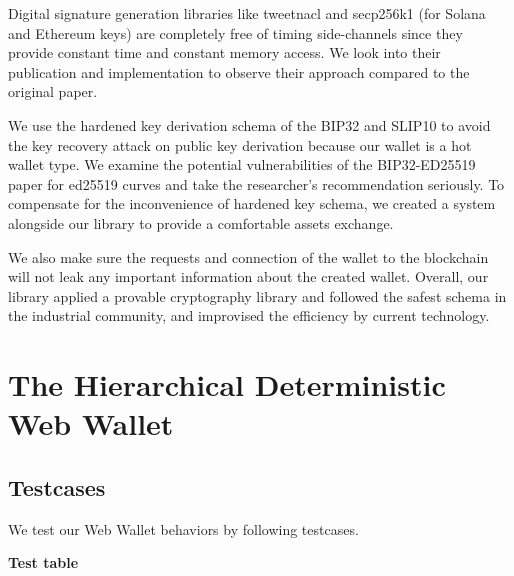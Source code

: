Digital signature generation libraries like tweetnacl and secp256k1 (for Solana and Ethereum keys) are completely free of timing side-channels since they provide constant time and constant memory access. We look into their publication and implementation to observe their approach compared to the original paper.

We use the hardened key derivation schema of the BIP32 and SLIP10 to avoid the key recovery attack on public key derivation because our wallet is a hot wallet type. We examine the potential vulnerabilities of the BIP32-ED25519 paper for ed25519 curves and take the researcher's recommendation seriously. To compensate for the inconvenience of hardened key schema, we created a system alongside our library to provide a comfortable assets exchange.

We also make sure the requests and connection of the wallet to the blockchain will not leak any important information about the created wallet. Overall, our library applied a provable cryptography library and followed the safest schema in the industrial community, and improvised the efficiency by current technology.

\section{The Hierarchical Deterministic Web Wallet}
\label{testhd}
\subsection{Testcases}
We test our Web Wallet behaviors by following testcases.

{\textbf{Test table}}

